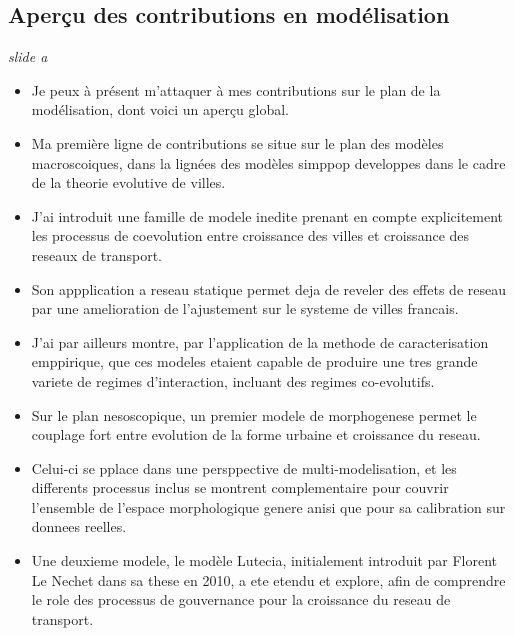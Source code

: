 \documentclass[12pt]{article}
\begin{document}


\newpage


\subsection*{Aperçu des contributions en modélisation}

\textit{slide a}

\begin{itemize}
	\item Je peux à présent m'attaquer à mes contributions sur le plan de la modélisation, dont voici un aperçu global.
	\item Ma première ligne de contributions se situe sur le plan des modèles macroscoiques, dans la lignées des modèles simppop developpes dans le cadre de la theorie evolutive de villes.
	\item J'ai introduit une famille de modele inedite prenant en compte explicitement les processus de coevolution entre croissance des villes et croissance des reseaux de transport.
	\item Son appplication a reseau statique permet deja de reveler des effets de reseau par une amelioration de l'ajustement sur le systeme de villes francais.
	\item J'ai par ailleurs montre, par l'application de la methode de caracterisation emppirique, que ces modeles etaient capable de produire une tres grande variete de regimes d'interaction, incluant des regimes co-evolutifs.
	\item Sur le plan nesoscopique, un premier modele de morphogenese permet le couplage fort entre evolution de la forme urbaine et croissance du reseau.
	\item Celui-ci se pplace dans une persppective de multi-modelisation, et les differents processus inclus se montrent complementaire pour couvrir l'ensemble de l'espace morphologique genere anisi que pour sa calibration sur donnees reelles.
	\item Une deuxieme modele, le modèle Lutecia, initialement introduit par Florent Le Nechet dans sa these en 2010, a ete etendu et explore, afin de comprendre le role des processus de gouvernance pour la croissance du reseau de transport.
\end{itemize}
\end{document}
